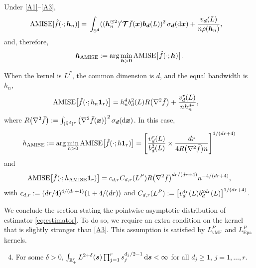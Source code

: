 \documentclass[oneside,11pt]{article}
\begin{document}
\begin{corollary}\label{cor:amisebwd}
Under \ref{A1}--\ref{A3},
\begin{align}
    \mathrm{AMISE}[\hat{f}(\cdot;{\boldsymbol{h}}_n)]=&\;\int_{\mathbb{S}^{\boldsymbol{d}}}(({\boldsymbol{h}}_n^{\odot 2})'\boldsymbol{\mathcal{T}}\bar{f}(\boldsymbol{x})\boldsymbol{b}_{\boldsymbol{d}}(L))^2\,\sigma_{\boldsymbol{d}}(\mathrm{d}\boldsymbol{x})+\frac{v_{\boldsymbol{d}}(L)}{n\rho({\boldsymbol{h}}_n)},\label{eq:amise}
\end{align}
and, therefore,
\begin{align}
    {\boldsymbol{h}}_\mathrm{AMISE}:= \arg\min_{{\boldsymbol{h}}>\mathbf{0}}\mathrm{AMISE}\big[\hat{f}(\cdot;{\boldsymbol{h}})\big].\label{eq:hamisedh}
\end{align}

When the kernel is $L^P$, the common dimension is $d$, and the equal bandwidth is $h_n$,
\begin{align}
    \mathrm{AMISE}\big[\hat{f}(\cdot;h_n\mathbf{1}_r)\big]=&\;h_n^4b^{2}_d(L)R\big(\nabla^2 \bar{f}\big)+\frac{v^r_{d}(L)}{nh_n^{dr}},\label{eq:amise1d}
\end{align}
where $R\big(\nabla^2 \bar{f}\big):= \int_{(\mathbb{S}^{d})^r}\big(\nabla^2 \bar{f}(\boldsymbol{x})\big)^2\,\sigma_{\boldsymbol{d}}(\mathrm{d}\boldsymbol{x})$. In this case,
\begin{align}
    h_\mathrm{AMISE}:= \arg\min_{h>0}\mathrm{AMISE}\big[\hat{f}(\cdot;h\mathbf{1}_r)\big]=\left[\frac{v^r_d(L)}{b^{2}_d(L)}\times\frac{dr}{4R\big(\nabla^2 \bar{f}\big)n}\right]^{1/(dr+4)}\label{eq:hamise}
\end{align}
and
\begin{align}
    \mathrm{AMISE}\big[\hat{f}(\cdot;h_\mathrm{AMISE}\mathbf{1}_r)\big]=c_{d,r}C_{d,r}(L^P)R\big(\nabla^2 \bar{f}\big)^{dr/(dr+4)}n^{-4/(dr+4)},\label{eq:optamise}
\end{align}
with $c_{d,r}:= (dr/4)^{4/(dr+1)}(1+4/(dr))$ and $C_{d,r}(L^P):=\left[v_d^{4r}(L) b^{2dr}_d(L)\right]^{1/(dr+4)}$.
\end{corollary}

We conclude the section stating the pointwise asymptotic distribution of estimator \eqref{eq:estimator}. To do so, we require an extra condition on the kernel that is slightly stronger than \ref{A3}. This assumption is satisfied by $L^P_\mathrm{vMF}$ and $L^P_\mathrm{Epa}$ kernels.

\begin{enumerate}[label=\textbf{A\arabic{*}}., ref=\textbf{A\arabic{*}}]
    \setcounter{enumi}{3}
    \item For some $\delta>0$, $\int_{\mathbb{R}_+^r} L^{2+\delta}(\boldsymbol{s}) \prod_{j=1}^r s_j^{d_j/2-1}\,\mathrm{d} \boldsymbol{s}<\infty$ for all $d_j\geq 1$,  $j=1,\ldots,r$. \label{A4}
\end{enumerate}
\end{document}

